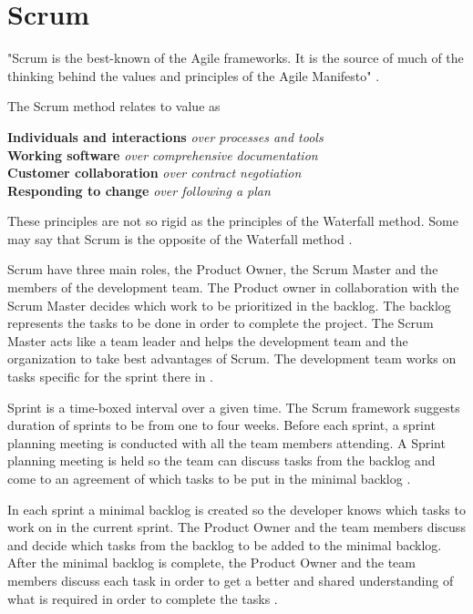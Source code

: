 \documentclass[UKenglish]{ifimaster}  %
\begin{document}
\section {Scrum}
\label{sec:Scrum}
"Scrum is the best-known of the Agile frameworks. It is the source of much of the thinking behind the values and principles of the Agile Manifesto" \parencite{Scrum}.

The Scrum method relates to value as
\\ 
\begin{center} \textbf{Individuals and interactions}  \textit{over processes and tools} \\
\textbf{Working software} \textit{over comprehensive documentation} \\
\textbf{Customer collaboration} \textit{over contract negotiation} \\
\textbf{Responding to change} \textit{over following a plan} \\
\end{center}


These principles are not so rigid as the principles of the Waterfall method. Some may say that Scrum is the opposite of the Waterfall method \parencite{cocco2011simulating}. 

Scrum have three main roles, the Product Owner, the Scrum Master and the members of the development team. The Product owner in collaboration with the Scrum Master decides which work to be prioritized in the backlog. The backlog represents the tasks to be done in order to complete the project. The Scrum Master acts like a team leader and helps the development team and the organization to take best advantages of Scrum. The development team works on tasks specific for the sprint there in \parencite{Scrum}.

Sprint is a time-boxed interval over a given time. The Scrum framework suggests duration of sprints to be from one to four weeks. Before each sprint, a sprint planning meeting is conducted with all the team members attending.  A Sprint planning meeting is held so the team can discuss tasks from the backlog and come to an agreement of which tasks to be put in the minimal backlog \parencite{Scrum}.

In each sprint a minimal backlog is created so the developer knows which tasks to work on in the current sprint. The Product Owner and the team members discuss and decide which tasks from the backlog to be added to the minimal backlog. After the minimal backlog is complete, the Product Owner and the team members discuss each task in order to get a better and shared understanding of what is required in order to complete the tasks \parencite{Scrum}. 
\end{document}
